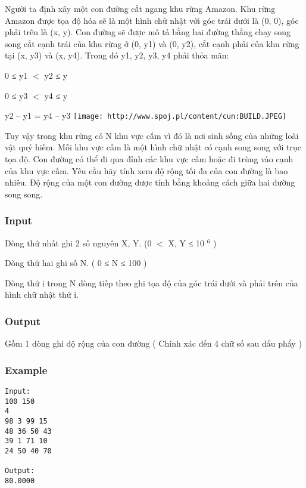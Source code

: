 



   Người ta định xây một con đường cắt ngang khu rừng Amazon. Khu rừng Amazon được tọa độ hóa sẽ là một hình chữ nhật với góc trái dưới là (0, 0), góc phải trên là (x, y). Con đường sẽ được mô tả bằng hai đường thẳng chạy song song cắt cạnh trái của khu rừng ở (0, y1) và (0, y2), cắt cạnh phải của khu rừng tại (x, y3) và (x, y4). Trong đó y1, y2, y3, y4 phải thỏa mãn:  

   0 ≤ y1 $<$ y2 ≤ y  

   0 ≤ y3 $<$ y4 ≤ y  

   y2 – y1 = y4 – y3  
\texttt{[image: http://www.spoj.pl/content/cun:BUILD.JPEG]}

   Tuy vậy trong khu rừng có N khu vực cấm vì đó là nơi sinh sống của những loài vật quý hiếm. Mỗi khu vực cấm là một hình chữ nhật có cạnh song song với trục tọa độ. Con đường có thể đi qua đỉnh các khu vực cấm hoặc đi trùng vào cạnh của khu vực cấm. Yêu cầu hãy tính xem độ rộng tối đa của con đường là bao nhiêu. Độ rộng của một con đường được tính bằng khoảng cách giữa hai đường song song.  

\subsubsection{   Input  }

   Dòng thứ nhất ghi 2 số nguyên X, Y. (0 $<$ X, Y ≤ 10   $^    6   $   )  

   Dòng thứ hai ghi số N. ( 0 ≤ N ≤ 100 )  

   Dòng thứ i trong N dòng tiếp theo ghi tọa độ của góc trái dưới và phải trên của hình chữ nhật thứ i.  

\subsubsection{   Output  }

   Gồm 1 dòng ghi độ rộng của con đường ( Chính xác đến 4 chữ số sau dấu phẩy )  

\subsubsection{   Example  }
\begin{verbatim}
Input:
100 150
4
98 3 99 15
48 36 50 43
39 1 71 10
24 50 40 70

Output:
80.0000
\end{verbatim}
